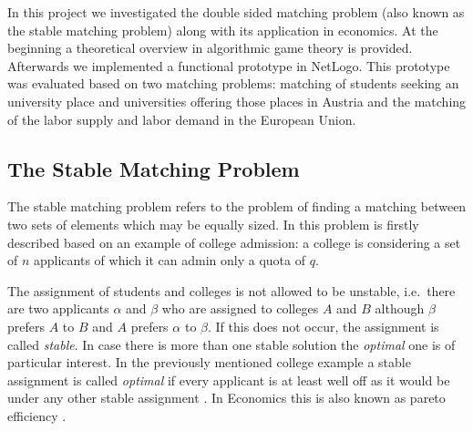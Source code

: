 In this project we investigated the double sided matching problem (also known as the stable matching problem) along with its application in economics. At the beginning a theoretical overview in algorithmic game theory is provided. Afterwards we implemented a functional prototype in NetLogo\cite{netlogo}. This prototype was evaluated based on two matching problems: matching of students seeking an university place and universities offering those places in Austria and the matching of the labor supply and labor demand in the European Union.

\subsection{The Stable Matching Problem}
The stable matching problem refers to the problem of finding a matching between two sets of elements which may be equally sized. In \cite[p. 9]{gale62a} this problem is firstly described based on an example of college admission: a college is considering a set of $n$ applicants of which it can admin only a quota of $q$.

The assignment of students and colleges is not allowed to be unstable, i.e.\ there are two applicants $\alpha$ and $\beta$ who are assigned to colleges $A$ and $B$ although $\beta$ prefers $A$ to $B$ and $A$ prefers $\alpha$ to $\beta$. If this does not occur, the assignment is called \textit{stable}. In case there is more than one stable solution the \textit{optimal} one is of particular interest. In the previously mentioned college example a stable assignment is called \textit{optimal} if every applicant is at least well off as it would be under any other stable assignment \cite[p. 10]{gale62a}. In Economics this is also known as pareto efficiency \cite[p. 46]{9780199297818}.


